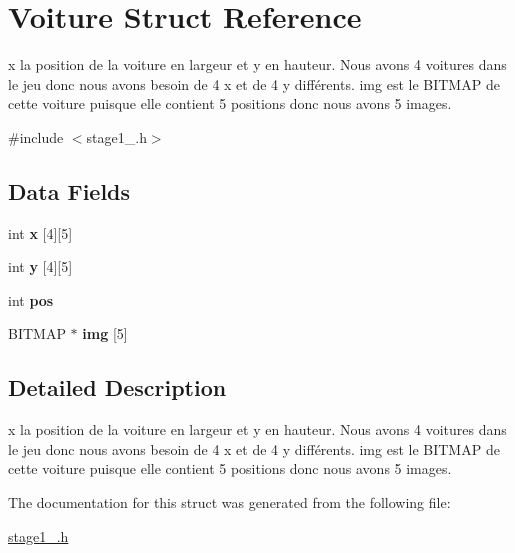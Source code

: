 \hypertarget{struct_voiture}{\section{Voiture Struct Reference}
\label{struct_voiture}
}


x la position de la voiture en largeur et y en hauteur. Nous avons 4 voitures dans le jeu donc nous avons besoin de 4 x et de 4 y différents. img est le B\-I\-T\-M\-A\-P de cette voiture puisque elle contient 5 positions donc nous avons 5 images.  




{\ttfamily \#include $<$stage1\-\_.\-h$>$}

\subsection*{Data Fields}
\begin{DoxyCompactItemize}
\item 
\hypertarget{struct_voiture_a3262d68fadd9073fb011753f04a0f97b}{int {\bfseries x} \mbox{[}4\mbox{]}\mbox{[}5\mbox{]}}\label{struct_voiture_a3262d68fadd9073fb011753f04a0f97b}

\item 
\hypertarget{struct_voiture_a07a778011e0af2da38651931a1ca7fe7}{int {\bfseries y} \mbox{[}4\mbox{]}\mbox{[}5\mbox{]}}\label{struct_voiture_a07a778011e0af2da38651931a1ca7fe7}

\item 
\hypertarget{struct_voiture_a1910d262855b71da353ed0d07a6c7823}{int {\bfseries pos}}\label{struct_voiture_a1910d262855b71da353ed0d07a6c7823}

\item 
\hypertarget{struct_voiture_a4206cc246eae0a153dd37253a8835ac9}{B\-I\-T\-M\-A\-P $\ast$ {\bfseries img} \mbox{[}5\mbox{]}}\label{struct_voiture_a4206cc246eae0a153dd37253a8835ac9}

\end{DoxyCompactItemize}


\subsection{Detailed Description}
x la position de la voiture en largeur et y en hauteur. Nous avons 4 voitures dans le jeu donc nous avons besoin de 4 x et de 4 y différents. img est le B\-I\-T\-M\-A\-P de cette voiture puisque elle contient 5 positions donc nous avons 5 images. 


\begin{DoxyItemize}
\item 
\end{DoxyItemize}

The documentation for this struct was generated from the following file\-:\begin{DoxyCompactItemize}
\item 
\hyperlink{stage1__2_8h}{stage1\-\_.\-h}\end{DoxyCompactItemize}

